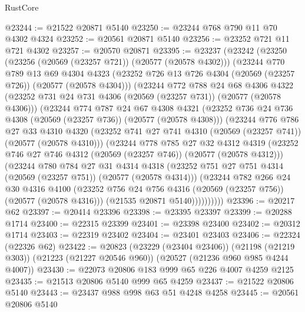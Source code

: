 \begin{lexlean}{RustCore}
\begin{coremodule}
@23244 := @21522 @20871 @5140
@23250 := @23244 @768 @790 @11 @70 @4302 @4324
@23252 := @20561 @20871 @5140
@23256 := @23252 @721 @11 @721 @4302
@23257 := @20570 @20871
@23395 := @23237
    (@23242
      (@23250
        (@23256 (@20569 (@23257 @721)) (@20577 (@20578 @4302)))
        (@23244
          @770
          @789
          @13
          @69
          @4304
          @4323
          (@23252 @726 @13 @726 @4304 (@20569 (@23257 @726)) (@20577 (@20578 @4304)))
          (@23244
            @772
            @788
            @24
            @68
            @4306
            @4322
            (@23252 @731 @24 @731 @4306 (@20569 (@23257 @731)) (@20577 (@20578 @4306)))
            (@23244
              @774
              @787
              @24
              @67
              @4308
              @4321
              (@23252 @736 @24 @736 @4308 (@20569 (@23257 @736)) (@20577 (@20578 @4308)))
              (@23244
                @776
                @786
                @27
                @33
                @4310
                @4320
                (@23252 @741 @27 @741 @4310 (@20569 (@23257 @741)) (@20577 (@20578 @4310)))
                (@23244
                  @778
                  @785
                  @27
                  @32
                  @4312
                  @4319
                  (@23252 @746 @27 @746 @4312 (@20569 (@23257 @746)) (@20577 (@20578 @4312)))
                  (@23244
                    @780
                    @784
                    @27
                    @31
                    @4314
                    @4318
                    (@23252 @751 @27 @751 @4314 (@20569 (@23257 @751)) (@20577 (@20578 @4314)))
                    (@23244
                      @782
                      @266
                      @24
                      @30
                      @4316
                      @4100
                      (@23252 @756 @24 @756 @4316 (@20569 (@23257 @756)) (@20577 (@20578 @4316)))
                      (@21535 @20871 @5140))))))))))
@23396 := @20217 @62
@23397 := @20414 @23396
@23398 := @23395 @23397
@23399 := @20288 @1714
@23400 := @22315 @23399
@23401 := @23398 @23400
@23402 := @20312 @1714
@23403 := @22319 @23402
@23404 := @23401 @23403
@23406 := @22324 (@22326 @62)
@23422 := @20823
    (@23229 (@23404 @23406))
    (@21198 (@21219 @303))
    (@21223 (@21227 @20546 @960))
    (@20527 (@21236 @960 @985 @4244 @4007))
@23430 := @22073 @20806 @183 @999 @65 @226 @4007 @4259 @2125
@23435 := @21513 @20806 @5140 @999 @65 @4259
@23437 := @21522 @20806 @5140
@23443 := @23437 @988 @998 @63 @51 @4248 @4258
@23445 := @20561 @20806 @5140

\end{coremodule}
\end{lexlean}
